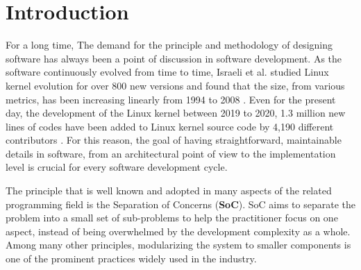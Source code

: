 \chapter*{Introduction}






For a long time, The demand for the principle and methodology of designing software has always been a point of discussion in software development.
As the software continuously evolved from time to time, Israeli et al. studied Linux kernel evolution for over 800 new versions and found that the size, from various metrics, has been increasing linearly from 1994 to 2008 \cite{10.1016/j.jss.2009.09.042}. Even for the present day, the development of the Linux kernel between 2019 to 2020, 1.3 million new lines of codes have been added to Linux kernel source code by 4,190 different contributors \cite{anderson2020}. For this reason, the goal of having straightforward, maintainable details in software, from an architectural point of view to the implementation level is crucial for every software development cycle.

The principle that is well known and adopted in many aspects of the related programming field is the Separation of Concerns (\textbf{SoC}). SoC aims to separate the problem into a small set of sub-problems to help the practitioner focus on one aspect, instead of being overwhelmed by the development complexity as a whole. Among many other principles, modularizing the system to smaller components is one of the prominent practices widely used in the industry.

